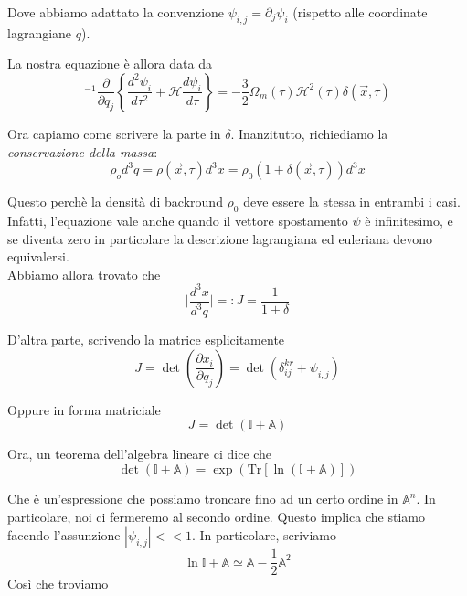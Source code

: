\documentclass{report}
\begin{document}
Dove abbiamo adattato la convenzione $\psi_{i,j} = \partial_j \psi_i$ (rispetto alle coordinate lagrangiane $q$). 

La nostra equazione è allora data da 
\begin{equation}
    [\delta^{kr}_{ij} + \psi_{i, j}]^{-1}\frac{\partial }{\partial q_j}\left\{\frac{d^2 \psi_i}{d\tau^2}  + \mathcal{H}\frac{d\psi_i}{d\tau}\right\} = -\frac{3}{2}\Omega_m(\tau)\mathcal{H}^2(\tau)\delta(\vec{x}, \tau)
\end{equation}

Ora capiamo come scrivere la parte in $\delta$. Inanzitutto, richiediamo la \emph{conservazione della massa}: 
\begin{equation}
    \rho_o d^3q = \rho(\vec{x}, \tau)d^3x = \rho_0(1+\delta(\vec{x}, \tau))d^3x
\end{equation}

Questo perchè la densità di backround $\rho_0$ deve essere la stessa in entrambi i casi. Infatti, l'equazione vale anche quando il vettore spostamento $\psi$ è infinitesimo, e se diventa zero in particolare la descrizione lagrangiana ed euleriana devono equivalersi. \\

Abbiamo allora trovato che 
\begin{equation}
    \biggr| \frac{d^3x}{d^3q}\biggr| = : J = \frac{1}{1+\delta}
\end{equation}

D'altra parte, scrivendo la matrice esplicitamente 
\begin{equation}
    J = \det{\left(\frac{\partial x_i}{\partial q_j}\right)} = \det{(\delta^{kr}_{ij} + \psi_{i,j})}
\end{equation}

Oppure in forma matriciale 
\begin{equation}
    J = \det{(\mathbb{I} + \mathbb{A})}
\end{equation}

Ora, un teorema dell'algebra lineare ci dice che 
\begin{equation}
    \det{(\mathbb{I} + \mathbb{A})} = \exp{(\text{Tr}[\ln{(\mathbb{I} + \mathbb{A})}])}
\end{equation}

Che è un'espressione che possiamo troncare fino ad un certo ordine in $\mathbb{A}^n$. In particolare, noi ci fermeremo al secondo ordine. Questo implica che stiamo facendo l'assunzione $|\psi_{i, j}|<<1$. In particolare, scriviamo 
\begin{equation}
    \ln{\mathbb{I} + \mathbb{A}} \simeq \mathbb{A} - \frac{1}{2}\mathbb{A}^2
\end{equation}
Così che troviamo 
\end{document}
